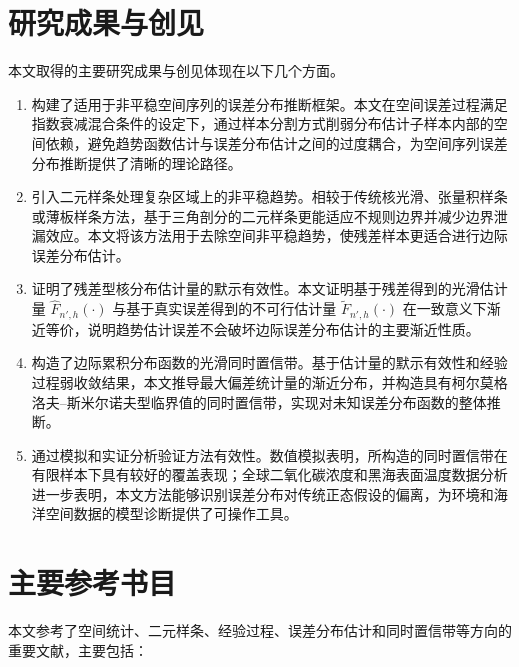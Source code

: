 \documentclass[UTF8,a4paper,11pt]{ctexart}
\begin{document}
\section{研究成果与创见}

本文取得的主要研究成果与创见体现在以下几个方面。

\begin{enumerate}
  \item 构建了适用于非平稳空间序列的误差分布推断框架。本文在空间误差过程满足指数衰减混合条件的设定下，通过样本分割方式削弱分布估计子样本内部的空间依赖，避免趋势函数估计与误差分布估计之间的过度耦合，为空间序列误差分布推断提供了清晰的理论路径。
  \item 引入二元样条处理复杂区域上的非平稳趋势。相较于传统核光滑、张量积样条或薄板样条方法，基于三角剖分的二元样条更能适应不规则边界并减少边界泄漏效应。本文将该方法用于去除空间非平稳趋势，使残差样本更适合进行边际误差分布估计。
  \item 证明了残差型核分布估计量的默示有效性。本文证明基于残差得到的光滑估计量 $\hat F_{n',h}(\cdot)$ 与基于真实误差得到的不可行估计量 $\tilde F_{n',h}(\cdot)$ 在一致意义下渐近等价，说明趋势估计误差不会破坏边际误差分布估计的主要渐近性质。
  \item 构造了边际累积分布函数的光滑同时置信带。基于估计量的默示有效性和经验过程弱收敛结果，本文推导最大偏差统计量的渐近分布，并构造具有柯尔莫格洛夫--斯米尔诺夫型临界值的同时置信带，实现对未知误差分布函数的整体推断。
  \item 通过模拟和实证分析验证方法有效性。数值模拟表明，所构造的同时置信带在有限样本下具有较好的覆盖表现；全球二氧化碳浓度和黑海表面温度数据分析进一步表明，本文方法能够识别误差分布对传统正态假设的偏离，为环境和海洋空间数据的模型诊断提供了可操作工具。
\end{enumerate}

\section{主要参考书目}

本文参考了空间统计、二元样条、经验过程、误差分布估计和同时置信带等方向的重要文献，主要包括：
\end{document}
